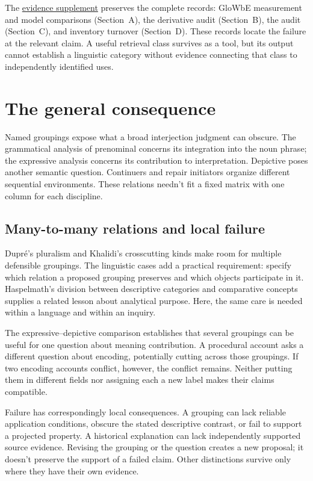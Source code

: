 The \href{inquiry-relative-evidence-supplement.pdf}{evidence supplement}
preserves the complete records: GloWbE measurement and model comparisons
(Section~A), the derivative audit (Section~B), the  audit
(Section~C), and inventory turnover (Section~D). These records locate
the failure at the relevant claim. A useful retrieval class survives
as a tool, but its output cannot establish a linguistic category
without evidence connecting that class to independently identified uses.

\section{The general consequence}\label{sec:discussion}

Named groupings expose what a broad interjection judgment can obscure.
The grammatical analysis of prenominal  concerns its
integration into the noun phrase; the expressive analysis concerns
its contribution to interpretation. Depictive  poses
another semantic question. Continuers and repair initiators organize
different sequential environments. These relations needn't fit a
fixed matrix with one column for each discipline.

\subsection{Many-to-many relations and local failure}

Dupr\'e's pluralism and Khalidi's crosscutting kinds make room for
multiple defensible groupings. The linguistic cases add a practical
requirement: specify which relation a proposed grouping preserves and
which objects participate in it. Haspelmath's division between descriptive
categories and comparative concepts supplies a related lesson about
analytical purpose. Here, the same care is needed within a language
and within an inquiry.

The expressive--depictive comparison establishes that several groupings
can be useful for one question about meaning contribution. A procedural
account asks a different question about encoding, potentially cutting
across those groupings. If two encoding accounts conflict, however,
the conflict remains. Neither putting them in different fields nor
assigning each a new label makes their claims compatible.

Failure has correspondingly local consequences. A grouping can lack
reliable application conditions, obscure the stated descriptive contrast,
or fail to support a projected property. A historical explanation can
lack independently supported source evidence. Revising the grouping or
the question creates a new proposal; it doesn't preserve the support
of a failed claim. Other distinctions survive only where they have
their own evidence.

